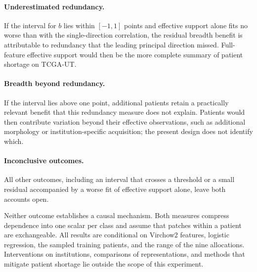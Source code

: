 \documentclass[11pt]{article}
\begin{document}
\paragraph{Underestimated redundancy.}
If the interval for $b$ lies within $[-1,1]$ points and effective support alone fits no worse than with the single-direction correlation, the residual breadth benefit is attributable to redundancy that the leading principal direction missed. Full-feature effective support would then be the more complete summary of patient shortage on TCGA-UT.

\paragraph{Breadth beyond redundancy.}
If the interval lies above one point, additional patients retain a practically relevant benefit that this redundancy measure does not explain. Patients would then contribute variation beyond their effective observations, such as additional morphology or institution-specific acquisition; the present design does not identify which.

\paragraph{Inconclusive outcomes.}
All other outcomes, including an interval that crosses a threshold or a small residual accompanied by a worse fit of effective support alone, leave both accounts open.

Neither outcome establishes a causal mechanism. Both measures compress dependence into one scalar per class and assume that patches within a patient are exchangeable. All results are conditional on Virchow2 features, logistic regression, the sampled training patients, and the range of the nine allocations. Interventions on institutions, comparisons of representations, and methods that mitigate patient shortage lie outside the scope of this experiment.



\end{document}
